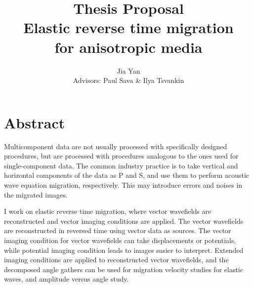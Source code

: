 \title{\textbf{Thesis Proposal} \\ 
\LARGE{Elastic reverse time migration\\ for anisotropic media}}
\author{\large\textup{ Jia Yan}\\ Advisors: Paul Sava \& Ilya Tsvankin}









\tableofcontents
\newpage



\def\CURL#1{\nabla \times {#1}}
\def\GRAD#1{\nabla {#1}}
\def\DIV#1{\nabla \cdot {#1}}
\def\LAPL#1{\nabla^2 {#1}}

\def\uu{\mathbf u}

\def\xx{ x,z}
\def\ofx { \lp \xx   \rp}
\def\ofxt{ \lp \xx,t \rp}

\def\IM#1{  {I}_{#1} \ofx }
\def\US#1{{u_s}_{#1} \ofxt}
\def\UR#1{{u_r}_{#1} \ofxt}

\def\P#1{ P_{#1} \ofxt }
\def\S#1{ S_{#1} \ofxt }
%



\section{Abstract}
Multicomponent data are not usually processed with specifically designed procedures, but are processed with procedures analogous to the ones used for single-component data. The common industry practice is to take vertical and horizontal components of the data as P and S, and use them to perform acoustic wave equation migration, respectively. This may introduce errors and noises in the migrated images. 

I work on elastic reverse time migration, where vector wavefields are reconstructed and vector imaging conditions are applied. The vector wavefields are reconstructed in reversed time using vector data as sources. The vector imaging condition for vector wavefields can take displacements or potentials, while potential imaging condition leads to images easier to interpret. 
Extended imaging conditions are applied to reconstructed vector wavefields, and the decomposed angle gathers can be used for migration velocity studies for elastic waves, and amplitude versus angle study. 

